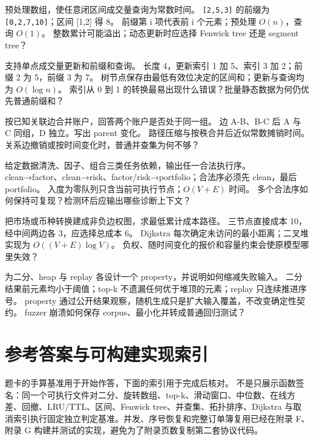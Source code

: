 {预处理数组，使任意闭区间成交量查询为常数时间。}
{\texttt{[2,5,3]} 的前缀为 \texttt{[0,2,7,10]}；区间 [1,2] 得 8。}
{前缀第 i 项代表前 i 个元素；预处理 \(O(n)\)，查询 \(O(1)\)。}
{整数累计可能溢出；动态更新时应选择 Fenwick tree 还是 segment tree？}

{支持单点成交量更新和前缀和查询。}
{长度 4，更新索引 1 加 5、索引 3 加 2；前缀 2 为 5，前缀 3 为 7。}
{树节点保存由最低有效位决定的区间和；更新与查询均为 \(O(\log n)\)。}
{索引从 0 到 1 的转换最易出现什么错误？批量静态数据为何仍优先普通前缀和？}

{按已知关联边合并账户，回答两个账户是否处于同一组。}
{边 A-B、B-C 后 A 与 C 同组，D 独立。写出 parent 变化。}
{路径压缩与按秩合并后近似常数摊销时间。}
{关系边撤销或按时间变化时，普通并查集为何不够？}

{给定数据清洗、因子、组合三类任务依赖，输出任一合法执行序。}
{clean→factor、clean→risk、factor/risk→portfolio；合法序必须先 clean，最后 portfolio。}
{入度为零队列只含当前可执行节点；\(O(V+E)\) 时间。}
{多个合法序如何保持可复现？检测环后应输出哪些诊断上下文？}

{把市场或币种转换建成非负边权图，求最低累计成本路径。}
{三节点直接成本 10，经中间两边各 3，应选择总成本 6。}
{Dijkstra 每次确定未访问的最小距离；二叉堆实现为 \(O((V+E)\log V)\)。}
{负权、随时间变化的报价和容量约束会使原模型哪里失效？}

{为二分、heap 与 replay 各设计一个 property，并说明如何缩减失败输入。}
{二分结果前元素均小于阈值；top-k 不遗漏任何优于堆顶的元素；replay 只连续推进序号。}
{property 通过公开结果观察，随机生成只是扩大输入覆盖，不改变确定性契约。}
{fuzzer 崩溃如何保存 corpus、最小化并转成普通回归测试？}

\clearpage
\section{参考答案与可构建实现索引}

题卡的手算基准用于开始作答，下面的索引用于完成后核对。 不是只展示函数签名：同一个可执行文件对二分、旋转数组、top-k、滑动窗口、中位数、在线方差、回撤、LRU/TTL、区间、Fenwick tree、并查集、拓扑排序、Dijkstra 与取消索引执行固定独立判定基准。并发、序号恢复和完整订单簿复用已经在附录 F、附录 G 构建并测试的实现，避免为了附录页数复制第二套协议代码。

